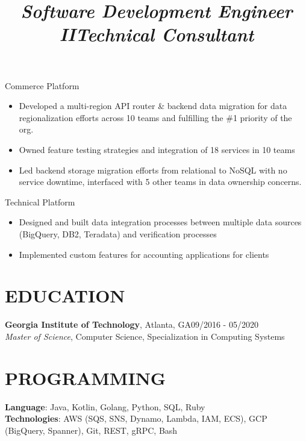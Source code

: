 \documentclass[margin,11pt]{res}
\begin{document}
\begin{resume}
\title{\sl{Software Development Engineer II}}
\begin{position}
Commerce Platform\\
\begin{itemize}
\item Developed a multi-region API router \&  backend data migration for data regionalization efforts across 10 teams and fulfilling the \#1 priority of the org.
\item Owned feature testing strategies and integration of 18 services in 10 teams
\item Led backend storage migration efforts from relational to NoSQL with no service downtime, interfaced with 5 other teams in data ownership concerns.
\end{itemize}
\end{position}

\title{\sl{Technical Consultant}}
\begin{position}
Technical Platform\\
\begin{itemize}
\item Designed and built data integration processes between multiple data sources (BigQuery, DB2, Teradata) and verification processes
\item Implemented custom features for accounting applications for clients
\end{itemize}
\end{position}

\section{EDUCATION}
\textbf{Georgia Institute of Technology}, Atlanta, GA\hfill 09/2016 - 05/2020\\
{\sl Master of Science}, Computer Science, Specialization in Computing Systems\\


\section{PROGRAMMING}

\textbf{Language}: Java, Kotlin, Golang, Python, SQL, Ruby\\
\textbf{Technologies}: AWS (SQS, SNS, Dynamo, Lambda, IAM, ECS), GCP (BigQuery, Spanner), Git, REST, gRPC, Bash\\

\end{resume}
\end{document}
